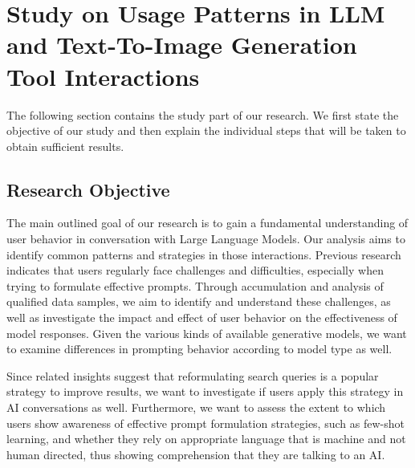\section{Study on Usage Patterns in LLM and Text-To-Image Generation Tool Interactions}
\label{sec:study-on-usage-patterns-in-llm-and-text-to-image-generation-tool-interactions}
The following section contains the study part of our research.
We first state the objective of our study and then explain the individual steps that will be
taken to obtain sufficient results.
\subsection{Research Objective}
\label{subsec:research-objective}
The main outlined goal of our research is to gain a fundamental understanding of user behavior in conversation with Large Language Models.
Our analysis aims to identify common patterns and strategies in those interactions.
Previous research indicates that users regularly face challenges and difficulties, especially
when trying to formulate effective prompts.
Through accumulation and analysis of qualified data samples, we aim to identify and understand these
challenges,
as well as investigate the impact and effect of user behavior on the effectiveness of model
responses.
Given the various kinds of available generative models, we want to examine differences in
prompting behavior according to model type as well.

Since related insights suggest that reformulating search queries is a popular strategy to improve
results, we want to investigate if users apply this strategy in AI conversations as well.
Furthermore, we want to assess the extent to which users show awareness of effective prompt
formulation strategies, such as few-shot learning, and whether they rely on appropriate language
that is machine and not human directed, thus showing comprehension that they are talking to an AI\@.

